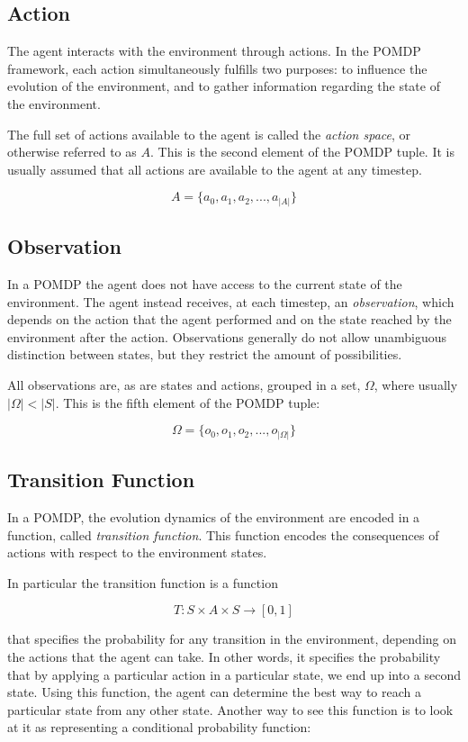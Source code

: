 \subsection{Action}

The agent interacts with the environment through actions. In the POMDP framework, each action
simultaneously fulfills two purposes: to influence the evolution of the environment, and to gather
information regarding the state of the environment.

The full set of actions available to the agent is called the \textit{action space}, or otherwise
referred to as $A$. This is the second element of the POMDP tuple. It is usually assumed that all
actions are available to the agent at any timestep.

\[ A = \{ a_0, a_1, a_2, ..., a_{|A|} \} \]

\subsection{Observation}

In a POMDP the agent does not have access to the current state of the environment. The agent instead
receives, at each timestep, an \textit{observation}, which depends on the action that the agent
performed and on the state reached by the environment after the action. Observations generally do
not allow unambiguous distinction between states, but they restrict the amount of possibilities.

All observations are, as are states and actions, grouped in a set, $\Omega$, where usually $|\Omega| <
|S|$. This is the fifth element of the POMDP tuple:

\[ \Omega = \{ o_0, o_1, o_2, ..., o_{|\Omega|} \} \]

\subsection{Transition Function}

In a POMDP, the evolution dynamics of the environment are encoded in a function, called
\textit{transition function}. This function encodes the consequences of actions with respect to the
environment states.

In particular the transition function is a function

\[ T: S\times A \times S \rightarrow [0,1] \]

that specifies the probability for any transition in the environment, depending on the actions that
the agent can take. In other words, it specifies the probability that by applying a particular
action in a particular state, we end up into a second state. Using this function, the agent can
determine the best way to reach a particular state from any other state. Another way to see this
function is to look at it as representing a conditional probability function:

